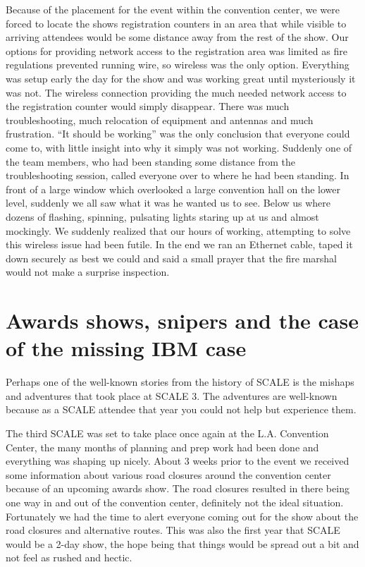 Because of the placement for the event within the convention center, we were
forced to locate the shows registration counters in an area that while visible
to arriving attendees would be some distance away from the rest of the show. 
Our options for providing network access to the registration area was limited as
fire regulations prevented running wire, so wireless was the only option. Everything was setup early the day for the show and was working great until mysteriously it was not. The wireless connection providing the much needed network access to the registration counter would simply disappear. There was much troubleshooting, much relocation of equipment and antennas and much frustration. ``It should be working'' was the only conclusion that everyone could come to, with little insight into why it simply was not working. Suddenly one of the team members, who had been standing some distance from the troubleshooting session, called everyone over to where he had been standing. In front of a large window which overlooked a large convention hall on the lower level, suddenly we all saw what it was he wanted us to see. Below us where dozens of flashing, spinning, pulsating lights staring up at us and almost mockingly. 
We suddenly realized that our hours of working, attempting to solve this
wireless issue had been futile. In the end we ran an Ethernet cable, taped it down securely as best we could and said a small prayer that the fire marshal
would not make a surprise inspection.

\section*{Awards shows, snipers and the case of the missing IBM case}

Perhaps one of the well-known stories from the history of SCALE is the mishaps
and adventures that took place at SCALE 3. The adventures are well-known because
as a SCALE attendee that year you could not help but experience them.

The third SCALE was set to take place once again at the L.A. Convention Center,
the many months of planning and prep work had been done and everything was
shaping up nicely. About 3 weeks prior to the event we received some
information about various road closures around the convention center because of
an upcoming awards show. The road closures resulted in there being one way in
and out of the convention center, definitely not the ideal situation. 
Fortunately we had the time to alert everyone coming out for the show about the
road closures and alternative routes. This was also the first year that SCALE
would be a 2-day show, the hope being that things would be spread out a bit and
not feel as rushed and hectic.


